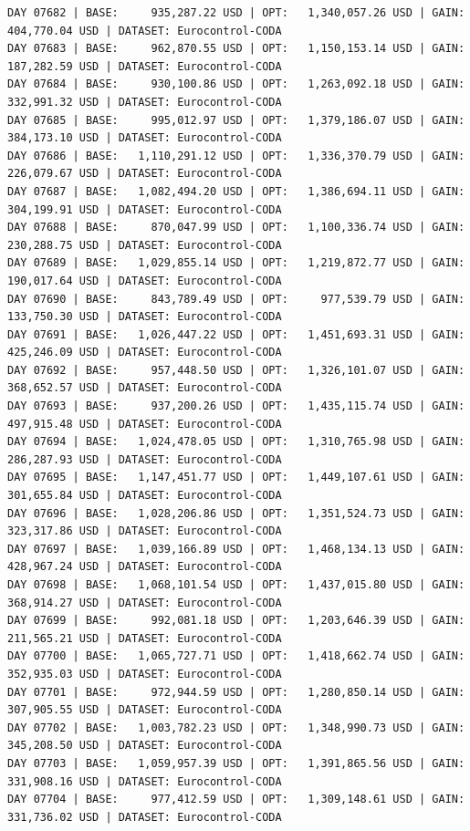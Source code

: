\documentclass[11pt,a4paper]{article}
\begin{document}
\begin{verbatim}
DAY 07682 | BASE:     935,287.22 USD | OPT:   1,340,057.26 USD | GAIN: 404,770.04 USD | DATASET: Eurocontrol-CODA
DAY 07683 | BASE:     962,870.55 USD | OPT:   1,150,153.14 USD | GAIN: 187,282.59 USD | DATASET: Eurocontrol-CODA
DAY 07684 | BASE:     930,100.86 USD | OPT:   1,263,092.18 USD | GAIN: 332,991.32 USD | DATASET: Eurocontrol-CODA
DAY 07685 | BASE:     995,012.97 USD | OPT:   1,379,186.07 USD | GAIN: 384,173.10 USD | DATASET: Eurocontrol-CODA
DAY 07686 | BASE:   1,110,291.12 USD | OPT:   1,336,370.79 USD | GAIN: 226,079.67 USD | DATASET: Eurocontrol-CODA
DAY 07687 | BASE:   1,082,494.20 USD | OPT:   1,386,694.11 USD | GAIN: 304,199.91 USD | DATASET: Eurocontrol-CODA
DAY 07688 | BASE:     870,047.99 USD | OPT:   1,100,336.74 USD | GAIN: 230,288.75 USD | DATASET: Eurocontrol-CODA
DAY 07689 | BASE:   1,029,855.14 USD | OPT:   1,219,872.77 USD | GAIN: 190,017.64 USD | DATASET: Eurocontrol-CODA
DAY 07690 | BASE:     843,789.49 USD | OPT:     977,539.79 USD | GAIN: 133,750.30 USD | DATASET: Eurocontrol-CODA
DAY 07691 | BASE:   1,026,447.22 USD | OPT:   1,451,693.31 USD | GAIN: 425,246.09 USD | DATASET: Eurocontrol-CODA
DAY 07692 | BASE:     957,448.50 USD | OPT:   1,326,101.07 USD | GAIN: 368,652.57 USD | DATASET: Eurocontrol-CODA
DAY 07693 | BASE:     937,200.26 USD | OPT:   1,435,115.74 USD | GAIN: 497,915.48 USD | DATASET: Eurocontrol-CODA
DAY 07694 | BASE:   1,024,478.05 USD | OPT:   1,310,765.98 USD | GAIN: 286,287.93 USD | DATASET: Eurocontrol-CODA
DAY 07695 | BASE:   1,147,451.77 USD | OPT:   1,449,107.61 USD | GAIN: 301,655.84 USD | DATASET: Eurocontrol-CODA
DAY 07696 | BASE:   1,028,206.86 USD | OPT:   1,351,524.73 USD | GAIN: 323,317.86 USD | DATASET: Eurocontrol-CODA
DAY 07697 | BASE:   1,039,166.89 USD | OPT:   1,468,134.13 USD | GAIN: 428,967.24 USD | DATASET: Eurocontrol-CODA
DAY 07698 | BASE:   1,068,101.54 USD | OPT:   1,437,015.80 USD | GAIN: 368,914.27 USD | DATASET: Eurocontrol-CODA
DAY 07699 | BASE:     992,081.18 USD | OPT:   1,203,646.39 USD | GAIN: 211,565.21 USD | DATASET: Eurocontrol-CODA
DAY 07700 | BASE:   1,065,727.71 USD | OPT:   1,418,662.74 USD | GAIN: 352,935.03 USD | DATASET: Eurocontrol-CODA
DAY 07701 | BASE:     972,944.59 USD | OPT:   1,280,850.14 USD | GAIN: 307,905.55 USD | DATASET: Eurocontrol-CODA
DAY 07702 | BASE:   1,003,782.23 USD | OPT:   1,348,990.73 USD | GAIN: 345,208.50 USD | DATASET: Eurocontrol-CODA
DAY 07703 | BASE:   1,059,957.39 USD | OPT:   1,391,865.56 USD | GAIN: 331,908.16 USD | DATASET: Eurocontrol-CODA
DAY 07704 | BASE:     977,412.59 USD | OPT:   1,309,148.61 USD | GAIN: 331,736.02 USD | DATASET: Eurocontrol-CODA

\end{verbatim}
\end{document}
